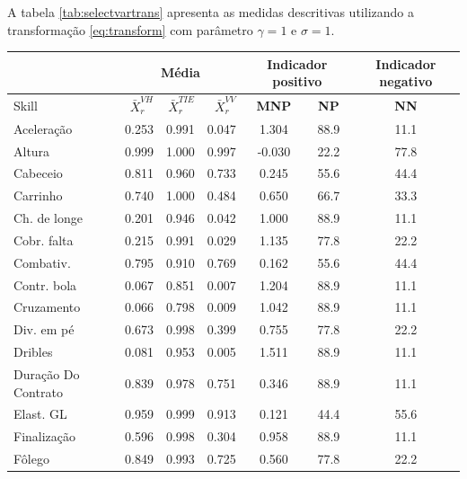 \documentclass[doc,apacite,oneside,a4paper,12pt]{apa6}
\begin{document}
A tabela \ref{tab:selectvartrans} apresenta as medidas descritivas utilizando a transformação \ref{eq:transform} com parâmetro $\gamma=1$ e $\sigma=1$.

\begin{table}[ht]
\begin{small}
\begin{tabular}{l||rrr||cc|||c}
  \hline
     \hline
\rowcolor{SeaGreen3!30!} & \multicolumn{3}{c||}{Média} &   \multicolumn{2}{c||||}{Indicador positivo} & \multicolumn{1}{c}{Indicador negativo} \\
\hline 
  \hline
\rowcolor{SeaGreen3!30!} Skill &  $\bar{X}_r^{VH}$ &  $\bar{X}_r^{TIE}$ &  $\bar{X}_r^{VV}$ & \textbf{MNP } & \textbf{NP }& \textbf{NN }\\ 
 \hline
\rowcolor{gray!30!} Aceleração & 0.253 & 0.991 & 0.047 & 1.304 & 88.9 & 11.1 \\ 
\rowcolor{gray!10!} Altura & 0.999 & 1.000 & 0.997 & -0.030 & 22.2 & 77.8 \\ 
\rowcolor{gray!30!} Cabeceio & 0.811 & 0.960 & 0.733 & 0.245 & 55.6 & 44.4 \\ 
\rowcolor{gray!10!} Carrinho & 0.740 & 1.000 & 0.484 & 0.650 & 66.7 & 33.3 \\ 
\rowcolor{gray!30!} Ch. de longe & 0.201 & 0.946 & 0.042 & 1.000 & 88.9 & 11.1 \\ 
\rowcolor{gray!10!} Cobr. falta & 0.215 & 0.991 & 0.029 & 1.135 & 77.8 & 22.2 \\ 
\rowcolor{gray!30!} Combativ. & 0.795 & 0.910 & 0.769 & 0.162 & 55.6 & 44.4 \\ 
\rowcolor{gray!10!} Contr. bola & 0.067 & 0.851 & 0.007 & 1.204 & 88.9 & 11.1 \\ 
\rowcolor{gray!30!} Cruzamento & 0.066 & 0.798 & 0.009 & 1.042 & 88.9 & 11.1 \\ 
\rowcolor{gray!10!} Div. em pé & 0.673 & 0.998 & 0.399 & 0.755 & 77.8 & 22.2 \\ 
\rowcolor{gray!30!} Dribles & 0.081 & 0.953 & 0.005 & 1.511 & 88.9 & 11.1 \\ 
\rowcolor{gray!10!} Duração Do Contrato & 0.839 & 0.978 & 0.751 & 0.346 & 88.9 & 11.1 \\ 
\rowcolor{gray!30!} Elast. GL & 0.959 & 0.999 & 0.913 & 0.121 & 44.4 & 55.6 \\ 
\rowcolor{gray!10!} Finalização & 0.596 & 0.998 & 0.304 & 0.958 & 88.9 & 11.1 \\ 
\rowcolor{gray!30!} Fôlego & 0.849 & 0.993 & 0.725 & 0.560 & 77.8 & 22.2 \\ 

\end{tabular}
\end{small}
\end{table}
\end{document}
